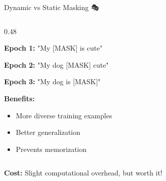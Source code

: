 \documentclass[aspectratio=169]{beamer}
\begin{document}
\begin{frame}[shrink=10]{Dynamic vs Static Masking 🎭}
\begin{columns}[T]
\begin{column}{0.48\textwidth}
\vspace{0.5em}

\textbf{Epoch 1:} "My [MASK] is cute"

\textbf{Epoch 2:} "My dog [MASK] cute"

\textbf{Epoch 3:} "My dog is [MASK]"

\vspace{0.5em}

\textbf{Benefits:}
\begin{itemize}\setlength{\itemsep}{0pt}
    \item More diverse training examples
    \item Better generalization
    \item Prevents memorization
\end{itemize}
\end{column}
\end{columns}

\vspace{1em}

\textbf{Cost:} Slight computational overhead, but worth it!
\end{frame}
\end{document}
